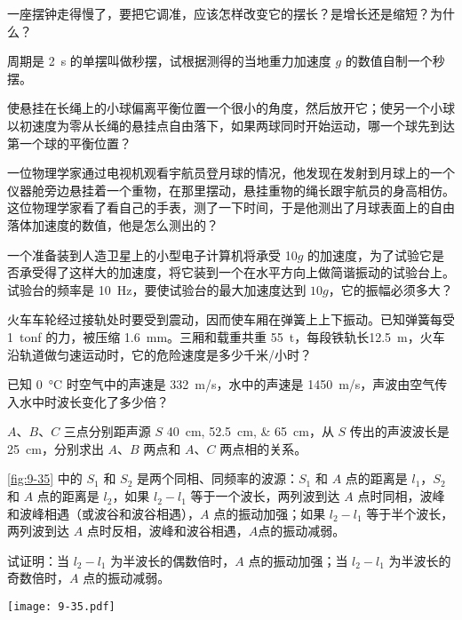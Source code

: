 \begin{Exercise}
\begin{question}
  \item 一座摆钟走得慢了，要把它调准，应该怎样改变它的摆长？是增长还是缩短？为什么？
  \item 周期是 \qty{2}{s} 的单摆叫做秒摆，试根据测得的当地重力加速度 $g$ 的数值自制一个秒摆。
  \item 使悬挂在长绳上的小球偏离平衡位置一个很小的角度，然后放开它；使另一个小球以初速度为零从长绳的悬挂点自由落下，如果两球同时开始运动，哪一个球先到达第一个球的平衡位置？
  \item 一位物理学家通过电视机观看宇航员登月球的情况，他发现在发射到月球上的一个仪器舱旁边悬挂着一个重物，在那里摆动，悬挂重物的绳长跟宇航员的身高相仿。这位物理学家看了看自己的手表，测了一下时间，于是他测出了月球表面上的自由落体加速度的数值，他是怎么测出的？
  \item 一个准备装到人造卫星上的小型电子计算机将承受 10$g$ 的加速度，为了试验它是否承受得了这样大的加速度，将它装到一个在水平方向上做简谐振动的试验台上。试验台的频率是 \qty{10}{Hz}，要使试验台的最大加速度达到 $10g$，它的振幅必须多大？
  \item 火车车轮经过接轨处时要受到震动，因而使车厢在弹簧上上下振动。已知弹簧每受 \qty{1}{tonf} 的力，被压缩 \qty{1.6}{mm}。三厢和载重共重 \qty{55}{t}，每段铁轨长\qty{12.5}{m}，火车沿轨道做匀速运动时，它的危险速度是多少千米/小时？
  \item 已知 \qty{0}{\celsius} 时空气中的声速是 \qty{332}{m/s}，水中的声速是 \qty{1450}{m/s}，声波由空气传入水中时波长变化了多少倍？
  \item $A$、$B$、$C$ 三点分别距声源 $S$ \qtylist{40;52.5;65}{cm}，从 $S$ 传出的声波波长是\qty{25}{cm}，分别求出 $A$、$B$ 两点和 $A$、$C$ 两点相的关系。
  \item \cref{fig:9-35} 中的 $S_1$ 和 $S_2$ 是两个同相、同频率的波源：$S_1$ 和 $A$ 点的距离是 $l_1$，$S_2$ 和 $A$ 点的距离是 $l_2$，如果 $l_2-l_1$ 等于一个波长，两列波到达 $A$ 点时同相，波峰和波峰相遇（或波谷和波谷相遇），$A$ 点的振动加强；如果 $l_2-l_1$ 等于半个波长，两列波到达 $A$ 点时反相，波峰和波谷相遇，$A$点的振动减弱。

  试证明：当 $l_2-l_1$ 为半波长的偶数倍时，$A$ 点的振动加强；当 $l_2-l_1$ 为半波长的奇数倍时，$A$ 点的振动减弱。
\end{question}
\begin{figurehere}
  \begin{minipage}{\linewidth}\centering
    \texttt{[image: 9-35.pdf]}
    \caption{}\label{fig:9-35}
  \end{minipage}
\end{figurehere}
\end{Exercise}
